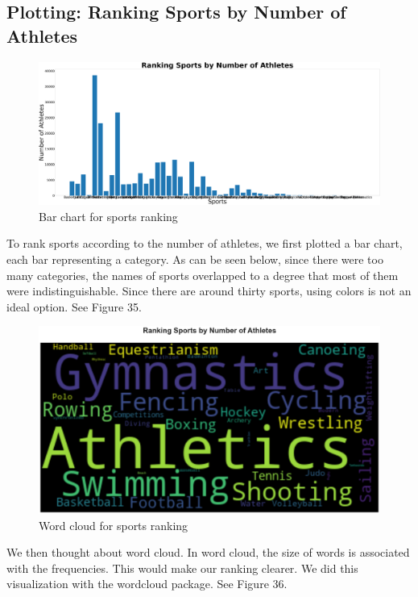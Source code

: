 \documentclass[12pt]{article}
\begin{document}
\subsection{Plotting: Ranking Sports by Number of Athletes}
\begin{figure}[!b]
    \centering
    \includegraphics[angle=270, scale=0.055]{pics/g-4-1.png}
    \caption{Bar chart for sports ranking}
    \label{fig:my_label}
\end{figure}
To rank sports according to the number of athletes, we first plotted a bar chart, each bar representing a category. As can be seen below, since there were too many categories, the names of sports overlapped to a degree that most of them were indistinguishable. Since there are around thirty sports, using colors is not an ideal option. See Figure 35.
\begin{figure}[!t]
    \centering
    \includegraphics[scale=0.33]{pics/g-4-2.png}
    \caption{Word cloud for sports ranking}
    \label{fig:my_label}
\end{figure}

We then thought about word cloud. In word cloud, the size of words is associated with the frequencies. This would make our ranking clearer. We did this visualization with the wordcloud package. See Figure 36.
\end{document}
